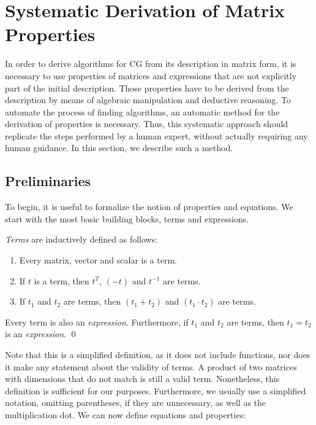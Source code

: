 \section{Systematic Derivation of Matrix Properties}
\label{sec:propertyDerivation}

In order to derive algorithms for CG from its description in matrix form, it is necessary to use properties of matrices and expressions that are not explicitly part of the initial description. Those properties have to be derived from the description by means of algebraic manipulation and deductive reasoning. To automate the process of finding algorithms, an automatic method for the derivation of properties is necessary. Thus, this systematic approach should replicate the steps performed by a human expert, without actually requiring any human guidance. In this section, we describe such a method.




\subsection{Preliminaries}

To begin, it is useful to formalize the notion of properties and equations. We start with the most basic building blocks, terms and expressions.

\begin{definition}
\emph{Terms} are inductively defined as follows:
\begin{enumerate}
\item Every matrix, vector and scalar is a term.
\item If $t$ is a term, then $t^T$, $(-t)$ and $t^{-1}$ are terms.
\item If $t_1$ and $t_2$ are terms, then $(t_1 + t_2)$ and $(t_1 \cdot t_2)$ are terms.
\end{enumerate}
Every term is also an \emph{expression}. Furthermore, if $t_1$ and $t_2$ are terms, then $t_1 = t_2$ is an \emph{expression}. \qed
\end{definition}

Note that this is a simplified definition, as it does not include functions,
nor does it make any statement about the validity of terms. A product of two matrices with dimensions that do not match is still a valid term. Nonetheless, this definition is sufficient for our purposes. Furthermore, we usually use a simplified notation, omitting parentheses, if they are unnecessary, as well as the multiplication dot. We can now define equations and properties:

